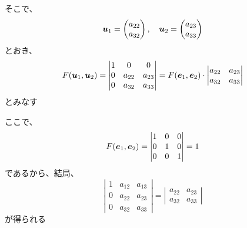 \documentclass[../../../topic_linear-algebra]{subfiles}
\begin{document}
そこで、
\begin{equation*}
  \vb*{u}_1 = \begin{pmatrix}
    a_{22} \\
    a_{32}
  \end{pmatrix},\quad
  \vb*{u}_2 = \begin{pmatrix}
    a_{23} \\
    a_{33}
  \end{pmatrix}
\end{equation*}
とおき、
\begin{equation*}
  F(\vb*{u}_1, \vb*{u}_2) = \left| \begin{matrix}
    1 & 0      & 0      \\
    0 & a_{22} & a_{23} \\
    0 & a_{32} & a_{33}
  \end{matrix} \right| = F(\vb*{e}_1, \vb*{e}_2) \cdot \left| \begin{matrix}
    a_{22} & a_{23} \\
    a_{32} & a_{33}
  \end{matrix} \right|
\end{equation*}
とみなす

\br

ここで、
\begin{equation*}
  F(\vb*{e}_1, \vb*{e}_2) = \left| \begin{matrix}
    1 & 0 & 0 \\
    0 & 1 & 0 \\
    0 & 0 & 1
  \end{matrix} \right| = 1
\end{equation*}
であるから、結局、
\begin{equation*}
  \left| \begin{matrix}
    1 & a_{12} & a_{13} \\
    0 & a_{22} & a_{23} \\
    0 & a_{32} & a_{33}
  \end{matrix} \right| = \left| \begin{matrix}
    a_{22} & a_{23} \\
    a_{32} & a_{33}
  \end{matrix} \right|
\end{equation*}
が得られる

\br
\end{document}
